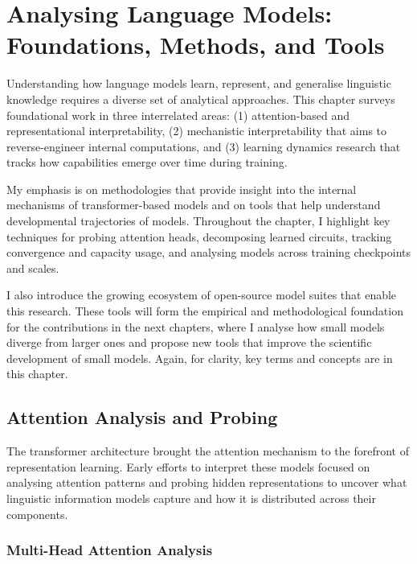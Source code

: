 \chapter{Analysing Language Models: Foundations, Methods, and Tools}
\label{chapter:analysis-background}

Understanding how language models learn, represent, and generalise linguistic knowledge requires a diverse set of analytical approaches. This chapter surveys foundational work in three interrelated areas: (1) attention-based and representational interpretability, (2) mechanistic interpretability that aims to reverse-engineer internal computations, and (3) learning dynamics research that tracks how capabilities emerge over time during training. 

My emphasis is on methodologies that provide insight into the internal mechanisms of transformer-based models and on tools that help understand developmental trajectories of models. Throughout the chapter, I highlight key techniques for probing attention heads, decomposing learned circuits, tracking convergence and capacity usage, and analysing models across training checkpoints and scales.

I also introduce the growing ecosystem of open-source model suites that enable this research. These tools will form the empirical and methodological foundation for the contributions in the next chapters, where I analyse how small models diverge from larger ones and propose new tools that improve the scientific development of small models. Again, for clarity, key terms and concepts are  in this chapter.

\section{Attention Analysis and Probing}

The transformer architecture \citep{vaswani2017attention} brought the attention mechanism to the forefront of representation learning. Early efforts to interpret these models focused on analysing attention patterns and probing hidden representations to uncover what linguistic information models capture and how it is distributed across their components.

\subsection{Multi-Head Attention Analysis}

